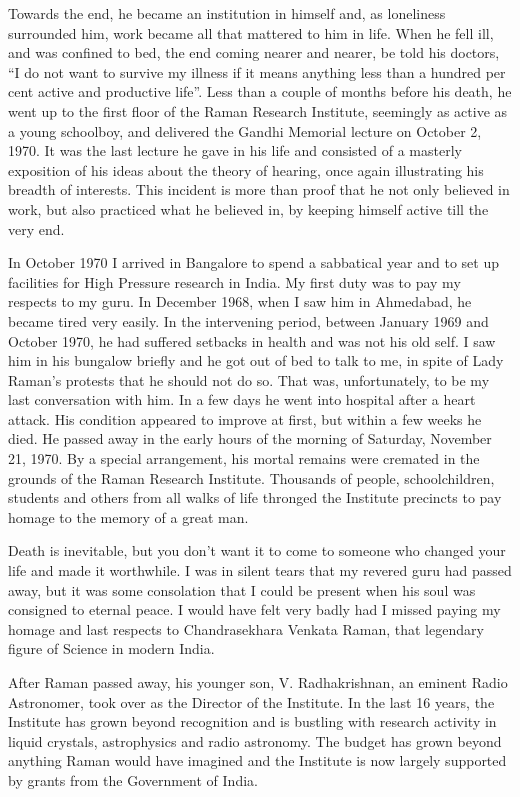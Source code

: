 Towards the end, he became an institution in himself and,
as loneliness surrounded him, work became all that mattered to
him in life. When he fell ill, and was confined to bed, the end
coming nearer and nearer, be told his doctors, ``I do not want
to survive my illness if it means anything less than a hundred
per cent active and productive life''. Less than a couple of months
before his death, he went up to the first floor of the Raman
Research Institute, seemingly as active as a young schoolboy, and
delivered the Gandhi Memorial lecture on October 2, 1970. It was
the last lecture he gave in his life and consisted of a masterly
exposition of his ideas about the theory of hearing, once again
illustrating his breadth of interests. This incident is more than
proof that he not only believed in work, but also practiced what
he believed in, by keeping himself active till the very end.


In October 1970 I arrived in Bangalore to spend a sabbatical
year and to set up facilities for High Pressure research in India.
My first duty was to pay my respects to my guru. In December
1968, when I saw him in Ahmedabad, he became tired very easily.
In the intervening period, between January 1969 and October
1970, he had suffered setbacks in health and was not his old self.
I saw him in his bungalow briefly and he got out of bed to talk
to me, in spite of Lady Raman's protests that he should not do
so. That was, unfortunately, to be my last conversation with him.
In a few days he went into hospital after a heart attack.
His condition appeared to improve at first, but within a few
weeks he died. He passed away in the early hours of the morning
of Saturday, November 21, 1970. By a special arrangement, his
mortal remains were cremated in the grounds of the Raman
Research Institute. Thousands of people, schoolchildren, students
and others from all walks of life thronged the Institute precincts
to pay homage to the memory of a great man.

Death is inevitable, but you don't want it to come to someone
who changed your life and made it worthwhile. I was in silent
tears that my revered guru had passed away, but it was some
consolation that I could be present when his soul was consigned
to eternal peace. I would have felt very badly had I missed paying
my homage and last respects to Chandrasekhara Venkata Raman,
that legendary figure of Science in modern India.

After Raman passed away, his younger son, V.  Radhakrishnan, an eminent Radio Astronomer, took over as the
Director of the Institute. In the last 16 years, the Institute has
grown beyond recognition and is bustling with research activity
in liquid crystals, astrophysics and radio astronomy. The budget
has grown beyond anything Raman would have imagined and
the Institute is now largely supported by grants from the
Government of India.



